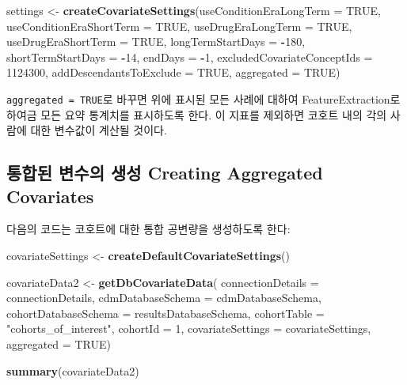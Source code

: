 \documentclass[11pt]{book}
\newenvironment{Shaded}{\begin{snugshade}}{\end{snugshade}}
\newcommand{\KeywordTok}[1]{\textcolor[rgb]{0.13,0.29,0.53}{\textbf{#1}}}
\newcommand{\DataTypeTok}[1]{\textcolor[rgb]{0.13,0.29,0.53}{#1}}
\newcommand{\DecValTok}[1]{\textcolor[rgb]{0.00,0.00,0.81}{#1}}
\newcommand{\StringTok}[1]{\textcolor[rgb]{0.31,0.60,0.02}{#1}}
\newcommand{\OtherTok}[1]{\textcolor[rgb]{0.56,0.35,0.01}{#1}}
\newcommand{\OperatorTok}[1]{\textcolor[rgb]{0.81,0.36,0.00}{\textbf{#1}}}
\newcommand{\NormalTok}[1]{#1}
\theoremstyle{definition}
\theoremstyle{definition}
\theoremstyle{definition}
\theoremstyle{remark}
\let\BeginKnitrBlock\begin \let\EndKnitrBlock\end
\begin{document}
\begin{Shaded}
\begin{Highlighting}[]
\NormalTok{settings <-}\StringTok{ }\KeywordTok{createCovariateSettings}\NormalTok{(}\DataTypeTok{useConditionEraLongTerm =} \OtherTok{TRUE}\NormalTok{, }
                                    \DataTypeTok{useConditionEraShortTerm =} \OtherTok{TRUE}\NormalTok{, }
                                    \DataTypeTok{useDrugEraLongTerm =} \OtherTok{TRUE}\NormalTok{, }
                                    \DataTypeTok{useDrugEraShortTerm =} \OtherTok{TRUE}\NormalTok{, }
                                    \DataTypeTok{longTermStartDays =} \OperatorTok{-}\DecValTok{180}\NormalTok{, }
                                    \DataTypeTok{shortTermStartDays =} \OperatorTok{-}\DecValTok{14}\NormalTok{, }
                                    \DataTypeTok{endDays =} \OperatorTok{-}\DecValTok{1}\NormalTok{, }
                                    \DataTypeTok{excludedCovariateConceptIds =} \DecValTok{1124300}\NormalTok{, }
                                    \DataTypeTok{addDescendantsToExclude =} \OtherTok{TRUE}\NormalTok{, }
                                    \DataTypeTok{aggregated =} \OtherTok{TRUE}\NormalTok{) }
\end{Highlighting}
\end{Shaded}

\BeginKnitrBlock{rmdimportant}
\texttt{aggregated\ =\ TRUE}로 바꾸면 위에 표시된 모든 사례에 대하여
FeatureExtraction로 하여금 모든 요약 통계치를 표시하도록 한다. 이 지표를
제외하면 코호트 내의 각의 사람에 대한 변수값이 계산될 것이다.
\EndKnitrBlock{rmdimportant}

\subsection{통합된 변수의 생성 Creating Aggregated
Covariates}\label{---creating-aggregated-covariates}

다음의 코드는 코호트에 대한 통합 공변량을 생성하도록 한다:

\begin{Shaded}
\begin{Highlighting}[]
\NormalTok{covariateSettings <-}\StringTok{ }\KeywordTok{createDefaultCovariateSettings}\NormalTok{() }

\NormalTok{covariateData2 <-}\StringTok{ }\KeywordTok{getDbCovariateData}\NormalTok{(}
  \DataTypeTok{connectionDetails =}\NormalTok{ connectionDetails, }
  \DataTypeTok{cdmDatabaseSchema =}\NormalTok{ cdmDatabaseSchema, }
  \DataTypeTok{cohortDatabaseSchema =}\NormalTok{ resultsDatabaseSchema, }
  \DataTypeTok{cohortTable =} \StringTok{"cohorts_of_interest"}\NormalTok{, }
  \DataTypeTok{cohortId =} \DecValTok{1}\NormalTok{, }
  \DataTypeTok{covariateSettings =}\NormalTok{ covariateSettings, }
  \DataTypeTok{aggregated =} \OtherTok{TRUE}\NormalTok{) }

\KeywordTok{summary}\NormalTok{(covariateData2) }
\end{Highlighting}
\end{Shaded}
\end{document}
